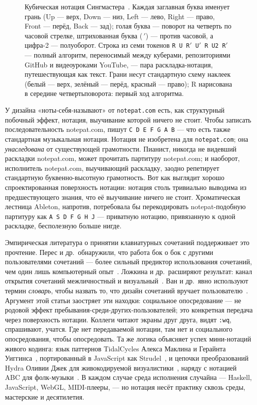 \documentclass[10pt,letterpaper,twocolumn]{article}
\begin{document}
\begin{figure}[t]
\caption{Кубическая нотация Сингмастера~\citep{singmaster1981notes}. Каждая заглавная буква именует грань (\textsf{U}p --- верх, \textsf{D}own --- низ, \textsf{L}eft --- лево, \textsf{R}ight --- право, \textsf{F}ront --- перёд, \textsf{B}ack --- зад); голая буква --- поворот на четверть по часовой стрелке, штрихованная буква ($\,'$) --- против часовой, а цифра-2 --- полуоборот. Строка из семи токенов \texttt{R U R$'$ U$'$ R U2 R$'$} --- полный алгоритм, переносимый между куберами, репозиториями GitHub и видеоуроками YouTube, --- пара раскладка-нотация, путешествующая как текст. Грани несут стандартную схему наклеек (белый --- верх, зелёный --- перёд, красный --- право); \textsf{R} нарисована в середине четвертьповорота: первый ход алгоритма.}
\label{fig:singmaster}
\end{figure}

У дизайна «ноты-себя-называют» от \texttt{notepat.com} есть, как структурный побочный эффект, нотация, выучивание которой ничего не стоит. Чтобы записать последовательность notepat.com, пишут \texttt{C D E F G A B} --- что есть также стандартная музыкальная нотация. Нотация не изобретена для \texttt{notepat.com}; она \emph{унаследована} от существующей грамотности. Пианист, никогда не видевший раскладки notepat.com, может прочитать партитуру notepat.com; и наоборот, исполнитель notepat.com, выучивающий раскладку, заодно репетирует стандартную буквенно-высотную грамотность. Вот как выглядит хорошо спроектированная поверхность нотации: нотация столь тривиально выводима из предшествующего знания, что её выучивание ничего не стоит. Хроматическая лестница Ableton, напротив, потребовала бы перекодировать notepat-подобную партитуру как \texttt{A S D F G H J} --- приватную нотацию, привязанную к одной раскладке, бесполезную больше нигде.

Эмпирическая литература о принятии клавиатурных сочетаний поддерживает это прочтение. Перес и др.\ обнаружили, что работа бок о бок с другими пользователями сочетаний --- более сильный предиктор использования сочетаний, чем один лишь компьютерный опыт~\citep{peres2004shortcut}. Ложкина и др.\ расширяют результат: канал открытия сочетаний межличностный и визуальный~\citep{lozhkina2025discovery}. Ван и др.\ явно используют термин \emph{словарь}, чтобы назвать то, что дизайн сочетаний вручает пользователю~\citep{wang2020keymap}. Аргумент этой статьи заостряет эти находки: социальное опосредование --- не родовой эффект пребывания-среди-других-пользователей; это конкретная передача через поверхность нотации. Коллеги читают экраны друг друга, видят \texttt{:wq}, спрашивают, учатся. Где нет передаваемой нотации, там нет и социального опосредования, чтобы опосредовать. Та же логика объясняет успех мини-нотаций живого кодинга: язык паттернов TidalCycles Алекса Маклина и Герайнта Уиггинса~\citep{mclean2010tidal}, портированный в JavaScript как Strudel~\citep{roos2023strudel}, и цепочки преобразований Hydra Оливии Джек для живокодируемой визуалистики~\citep{jack2018hydra}, наряду с нотацией ABC для фолк-музыки~\citep{walshaw_abc}. В каждом случае среда исполнения случайна --- Haskell, JavaScript, WebGL, MIDI-плееры, --- но нотация несёт практику сквозь среды, мастерские и десятилетия.
\end{document}
